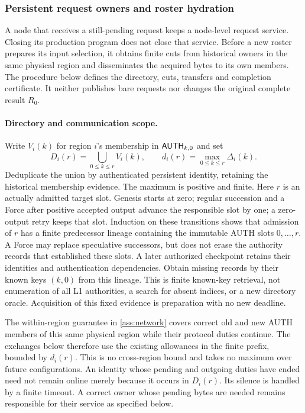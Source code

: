 \subsubsection{Persistent request owners and roster hydration}
\label{sec:ownership}
\label{sec:request-ownership}
A node that receives a still-pending request keeps a node-level request
service. Closing its production program does not close that service.
Before a new roster prepares its input selection, it obtains finite cuts
from historical owners in the same physical region and disseminates the
acquired bytes to its own members. The procedure below defines the
directory, cuts, transfers and completion certificate. It neither
publishes bare requests nor changes the original complete result $R_0$.

\paragraph{Directory and communication scope.}
Write $V_i(k)$ for region $i$'s membership in $\mathsf{AUTH}_{k,0}$ and set
\[
 D_i(r)=\bigcup_{0\le k\le r}V_i(k),\qquad
 d_i(r)=\max_{0\le k\le r}\Delta_i(k).
\]
Deduplicate the union by authenticated persistent identity, retaining
the historical membership evidence. The maximum is positive and finite.
Here $r$ is an actually admitted target slot. Genesis starts at zero;
regular succession and a Force after positive accepted output advance
the responsible slot by one; a zero-output retry keeps that slot.
Induction on these transitions shows that admission of $r$ has a finite
predecessor lineage containing the immutable AUTH slots $0,\ldots,r$.
A Force may replace speculative successors, but does not erase the
authority records that established these slots. A later authorized
checkpoint retains their identities and authentication dependencies.
Obtain missing records by their known keys $(k,0)$ from this lineage.
This is finite known-key retrieval, not enumeration of all L1
authorities, a search for absent indices, or a new directory oracle.
Acquisition of this fixed evidence is preparation with no new deadline.

The within-region guarantee in \cref{ass:network} covers correct old
and new AUTH members of this same physical region while their protocol
duties continue. The exchanges below therefore use the existing
allowances in the finite prefix, bounded by $d_i(r)$. This is no
cross-region bound and takes no maximum over future configurations.
An identity whose pending and outgoing duties have ended need not
remain online merely because it occurs in $D_i(r)$. Its silence is
handled by a finite timeout. A correct owner whose pending bytes are
needed remains responsible for their service as specified below.

